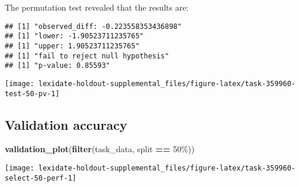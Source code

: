 \documentclass[
]{book}
\newenvironment{Shaded}{\begin{snugshade}}{\end{snugshade}}
\newcommand{\AttributeTok}[1]{\textcolor[rgb]{0.13,0.29,0.53}{#1}}
\newcommand{\DecValTok}[1]{\textcolor[rgb]{0.00,0.00,0.81}{#1}}
\newcommand{\FunctionTok}[1]{\textcolor[rgb]{0.13,0.29,0.53}{\textbf{#1}}}
\newcommand{\NormalTok}[1]{#1}
\newcommand{\OtherTok}[1]{\textcolor[rgb]{0.56,0.35,0.01}{#1}}
\newcommand{\SpecialCharTok}[1]{\textcolor[rgb]{0.81,0.36,0.00}{\textbf{#1}}}
\newcommand{\StringTok}[1]{\textcolor[rgb]{0.31,0.60,0.02}{#1}}
\begin{document}
The permutation test revealed that the results are:

\begin{Shaded}
\end{Shaded}

\begin{verbatim}
## [1] "observed_diff: -0.223558353436898"
## [1] "lower: -1.90523711235765"
## [1] "upper: 1.90523711235765"
## [1] "fail to reject null hypothesis"
## [1] "p-value: 0.85593"
\end{verbatim}

\texttt{[image: lexidate-holdout-supplemental\_files/figure-latex/task-359960-test-50-pv-1]}

\hypertarget{validation-accuracy-47}{%
\subsection{Validation accuracy}\label{validation-accuracy-47}}

\begin{Shaded}
\begin{Highlighting}[]
\FunctionTok{validation\_plot}\NormalTok{(}\FunctionTok{filter}\NormalTok{(task\_data, split }\SpecialCharTok{==} \StringTok{\textquotesingle{}50\%\textquotesingle{}}\NormalTok{))}
\end{Highlighting}
\end{Shaded}

\texttt{[image: lexidate-holdout-supplemental\_files/figure-latex/task-359960-select-50-perf-1]}
\end{document}
